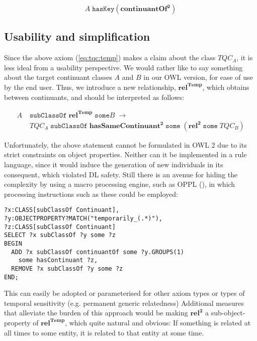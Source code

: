 \documentclass{ao2e}
\newcommand{\mirel}[1]{\ensuremath{\mathrm{\mathbf{#1}}}}
\newcommand{\mclass}[1]{\ensuremath{\mathit{#1}}}
\newcommand{\mrel}[2]{\mirel{#1^#2}}
\newcommand{\mrelb}[1]{\mrel{#1}{2}}
\newcommand{\TQC}[1]{\ensuremath{TQC_{\mclass{#1}}}}
\newcommand{\mreltemp}[1]{\mrel{#1}{{Temp}}}
\begin{document}
\begin{equation}
\mclass{A}\;\mathtt{hasKey}(\mrelb{continuantOf})
\end{equation}

\subsection{Usability and simplification}
Since the above axiom (\ref{eq:tqc:temp}) makes a claim about the class \TQC{A},
it is less ideal from a usability perspective. We would rather like to say
something about the target continuant classes \mclass{A} and \mclass{B} in our OWL version, for
ease of use by the end user. Thus, we introduce a new relationship,
\mreltemp{rel}, which obtains between continuants, and should be interpreted as follows:


\begin{equation}
\begin{split}
\mclass{A}\;&\mathtt{subClassOf}\;\mreltemp{rel}\;\mathtt{some}\mclass{B}\;\rightarrow\\
&\TQC{A}\;\mathtt{subClassOf}\;\mrelb{hasSameContinuant}\;\mathtt{some}\;(\mrelb{rel}\;\mathtt{some}\;
\TQC{B}) 
\end{split}
\end{equation}

Unfortunately, the above statement cannot be formulated in OWL 2 due to its
strict constraints on object properties. Neither can it be implemented in a
rule language, since it would induce the generation of new individuals in its
consequent, which violated DL safety. Still there is an avenue for hiding the
complexity by using a macro processing engine, such as OPPL (\cite{OPPL}), in
which processing instructions such as these could be employed:

\begin{lstlisting}
?x:CLASS[subClassOf Continuant],
?y:OBJECTPROPERTY?MATCH("temporarily_(.*)"),
?z:CLASS[subClassOf Continuant]
SELECT ?x subClassOf ?y some ?z
BEGIN
  ADD ?x subClassOf continuantOf some ?y.GROUPS(1) 
    some hasContinuant ?z,
  REMOVE ?x subClassOf ?y some ?z
END;
\end{lstlisting}
This can easily be adopted or parameterised for other axiom types or types of temporal
sensitivity (e.g. permanent generic relatedness) Additional measures that alleviate the burden of this approach would be making
\mrelb{rel} a sub-object-property of \mreltemp{rel}, which quite natural and
obvious: If something is related at all times to some entity, it is related to
that entity at some time.
\end{document}

